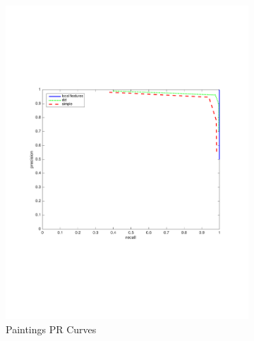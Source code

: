 \documentclass[english,12pt,a4paper,pdftex,elec,utf8, table]{aaltothesis}
\begin{document}
\begin{figure}[htb]
\begin{center}
\begin{subfigure}[b]{0.49\textwidth}
    \includegraphics[width=\textwidth]{figures/SaturatecolorsPR.pdf}
    \caption{Paintings PR Curves}
    \label{Saturaterocthinglink}
  \end{subfigure}
  \begin{subfigure}[b]{0.49\textwidth}

\end{subfigure}
\end{center}
\end{figure}
\end{document}
